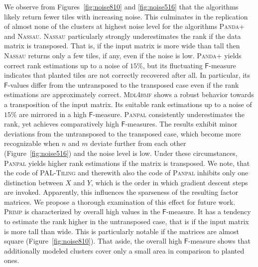 We observe from Figures~\ref{fig:noise810} and \ref{fig:noise516} that the algorithms likely return fewer tiles with increasing noise. This culminates in the replication of almost none of the clusters at highest noise level for the algorithms \textsc{Panda+} and \textsc{Nassau}. \textsc{Nassau} particularly strongly underestimates the rank if the data matrix is transposed. That is, if the input matrix is more wide than tall then \textsc{Nassau} returns only a few tiles, if any, even if the noise is low. \textsc{Panda+} yields correct rank estimations up to a noise of $15\%$, but its fluctuating $\mathsf{F}$-measure indicates that planted tiles are not correctly recovered after all. In particular, its $\mathsf{F}$-values  differ from the untransposed to the transposed case even if the rank estimations are approximately correct. \textsc{Mdl4bmf} shows a robust behavior towards a transposition of the input matrix. Its suitable rank estimations up to a noise of $15\%$ are mirrored in a high $\mathsf{F}$-measure. \textsc{Panpal} consistently underestimates the rank, yet achieves comparatively high $\mathsf{F}$-measures. The results exhibit minor deviations from the untransposed to the transposed case, which become more recognizable when $n$ and $m$ deviate further from each other (Figure~\ref{fig:noise516}) and the noise level is low. Under these circumstances, \textsc{Panpal} yields  higher rank estimations if the matrix is transposed. We note, that  the code of \textsc{PAL-Tiling} and therewith also the code of \textsc{Panpal} inhibits only one distinction between  $X$ and $Y$, which is the order in which gradient descent steps are invoked. Apparently, this influences the sparseness of the resulting factor matrices. We propose a thorough examination of this effect for future work.  
\textsc{Primp} is characterized by overall high values in the $\mathsf{F}$-measure. It has a tendency to estimate the rank higher in the untransposed case, that is if the input matrix is more tall than wide. This is particularly notable if the  matrices are almost square (Figure~\ref{fig:noise810}). That aside, the overall high $\mathsf{F}$-measure shows that additionally modeled clusters cover only a small area in comparison to planted ones. 

